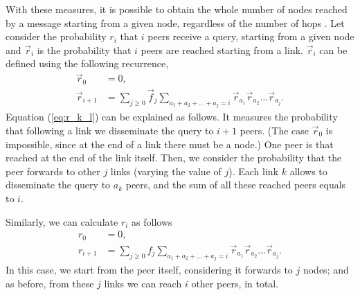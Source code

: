 \documentclass{sig-alternate}
\begin{document}
With these measures, it is possible to obtain the whole number of nodes reached by a message starting from a given node, regardless of the number of hops \cite{newmanHandbook}. Let consider the probability $r_i$ that $i$ peers receive a query, starting from a given node and $\overrightarrow{r}_i$ is the probability that $i$ peers are reached starting from a link. $\overrightarrow{r}_i$ can be defined using the following recurrence,
\begin{align}\label{eq:r_k_l}
  \overrightarrow{r}_0 & =  0,\nonumber \\
  \overrightarrow{r}_{i+1} & =  \sum_{j \geq 0} \overrightarrow{f}_j \sum_{a_1 + a_2 + \ldots + a_j = i} \overrightarrow{r}_{a_1} \overrightarrow{r}_{a_2} \ldots \overrightarrow{r}_{a_j}.
\end{align}
Equation (\ref{eq:r_k_l}) can be explained as follows. It measures the probability that following a link we disseminate the query to $i+1$ peers. (The case $\overrightarrow{r}_0$ is impossible, since at the end of a link there must be a node.) One peer is that reached at the end of the link itself. Then, we consider the probability that the peer forwards to other $j$ links (varying the value of $j$). Each link $k$ allows to disseminate the query to $a_k$ peers, and the sum of all these reached peers equals to $i$.

Similarly, we can calculate $r_i$ as follows
\begin{align}\label{eq:r_k}
  r_0  &= 0,\nonumber \\
  r_{i+1}  &= \sum_{j \geq 0} f_j \sum_{a_1 + a_2 + \ldots + a_j = i} \overrightarrow{r}_{a_1} \overrightarrow{r}_{a_2} \ldots \overrightarrow{r}_{a_j}.
\end{align}
In this case, we start from the peer itself, considering it forwards to $j$ nodes; and as before, from these $j$ links we can reach $i$ other peers, in total.
\end{document}
